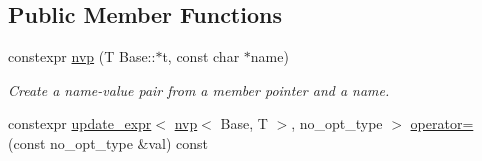 \subsection*{Public Member Functions}
\begin{DoxyCompactItemize}
\item 
constexpr \hyperlink{classmongo__odm_1_1nvp_ae4c0a86c0051de39061544e11fc69aee}{nvp} (T Base\+::$\ast$t, const char $\ast$name)
\begin{DoxyCompactList}\small\item\em Create a name-\/value pair from a member pointer and a name. \end{DoxyCompactList}\item 
constexpr \hyperlink{classmongo__odm_1_1update__expr}{update\+\_\+expr}$<$ \hyperlink{classmongo__odm_1_1nvp}{nvp}$<$ Base, T $>$, no\+\_\+opt\+\_\+type $>$ \hyperlink{classmongo__odm_1_1nvp_a6411d5ea34de1d719cac50b976cb9394}{operator=} (const no\+\_\+opt\+\_\+type \&val) const \hypertarget{classmongo__odm_1_1nvp_a6411d5ea34de1d719cac50b976cb9394}{}\label{classmongo__odm_1_1nvp_a6411d5ea34de1d719cac50b976cb9394}


\end{DoxyCompactItemize}

